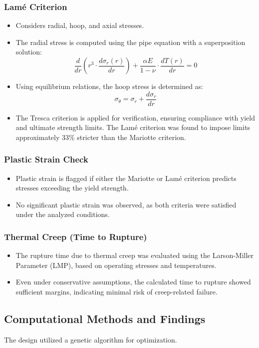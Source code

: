 \documentclass[11pt,a4paper,twoside]{article}
\begin{document}
\subsubsection{Lamé Criterion}
\begin{itemize}
    \item Considers radial, hoop, and axial stresses.
    \item The radial stress is computed using the pipe equation with a superposition solution:
    \[
    \frac{d}{dr} \left( r^3 \cdot \frac{d\sigma_r(r)}{dr} \right) + \frac{\alpha E}{1-\nu} \cdot \frac{dT(r)}{dr} = 0
    \]
    \item Using equilibrium relations, the hoop stress is determined as:
    \[
    \sigma_\theta = \sigma_r + \frac{d\sigma_r}{dr}
    \]
    \item The Tresca criterion is applied for verification, ensuring compliance with yield and ultimate strength limits. The Lamé criterion was found to impose limits approximately 33\% stricter than the Mariotte criterion.
\end{itemize}

\subsubsection{Plastic Strain Check}
\begin{itemize}
    \item Plastic strain is flagged if either the Mariotte or Lamé criterion predicts stresses exceeding the yield strength.
    \item No significant plastic strain was observed, as both criteria were satisfied under the analyzed conditions.
\end{itemize}

\subsubsection{Thermal Creep (Time to Rupture)}
\begin{itemize}
    \item The rupture time due to thermal creep was evaluated using the Larson-Miller Parameter (LMP), based on operating stresses and temperatures.
    \item Even under conservative assumptions, the calculated time to rupture showed sufficient margins, indicating minimal risk of creep-related failure.
\end{itemize}


\subsection{Computational Methods and Findings}
The design utilized a genetic algorithm for optimization.
\end{document}
